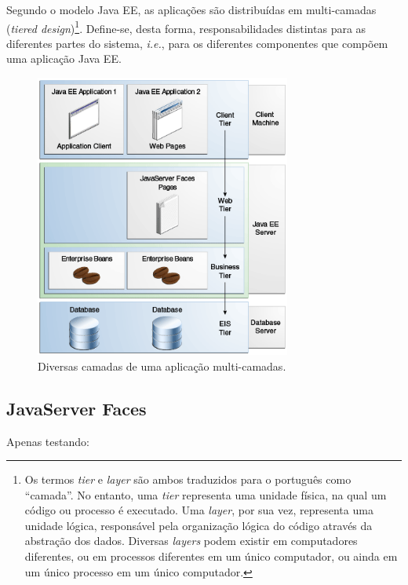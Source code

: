 \documentclass[
  10.5pt,				  %
	openright,			%
	twoside,			  %
  a5paper,
  chapter=TITLE,	%
	section=TITLE,	%
  hyphens,        %
	english,        %
	brazil          %
]{abntex2}
\begin{document}
Segundo o modelo Java EE, as aplicações são distribuídas em multi-camadas (\emph{tiered design})\footnote{Os termos \emph{tier} e \emph{layer} são ambos traduzidos para o português como ``camada''. No entanto, uma \emph{tier} representa uma unidade física, na qual um código ou processo é executado. Uma \emph{layer}, por sua vez, representa uma unidade lógica, responsável pela organização lógica do código através da abstração dos dados. Diversas \emph{layers} podem existir em computadores diferentes, ou em processos diferentes em um único computador, ou ainda em um único processo em um único computador.\cite{lhotka}}. Define-se, desta forma, responsabilidades distintas para as diferentes partes do sistema, \emph{i.e.}, para os diferentes componentes que compõem uma aplicação Java EE.

\begin{figure}[!ht]
  \caption{\label{fig:multitiered_app}Diversas camadas de uma aplicação multi-camadas.}
  \begin{center}
    \includegraphics[width=0.75\textwidth]{multitiered_applications.png}
  \end{center}
\end{figure}


\subsection{JavaServer Faces}
Apenas testando:
\end{document}
